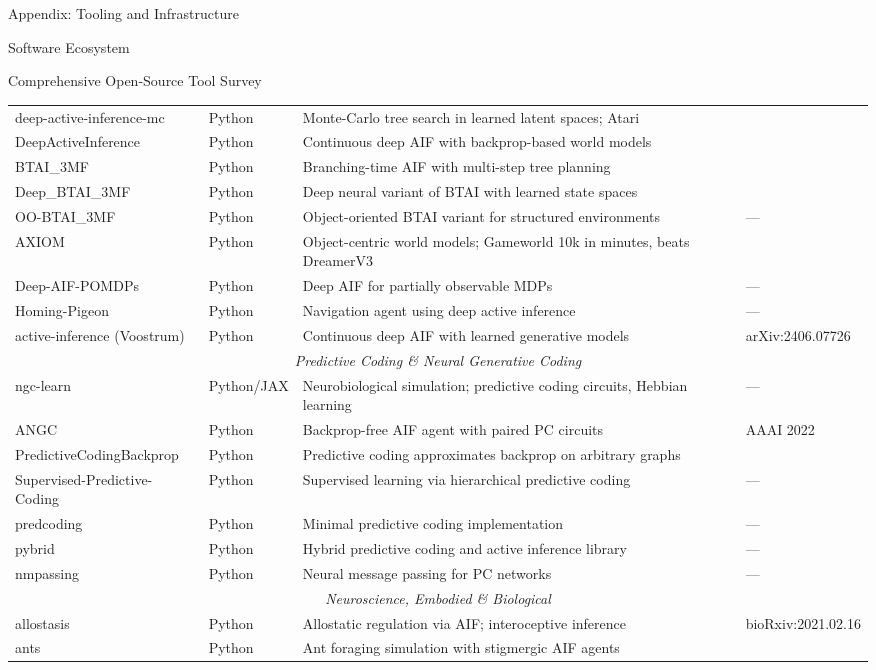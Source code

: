 \documentclass[
  ignorenonframetext,
]{beamer}
\begin{document}
\begin{frame}[fragile]{Appendix: Tooling and Infrastructure
\label{sec:tooling}}
\begin{block}{Software Ecosystem}
\begin{block}{Comprehensive Open-Source Tool Survey}
\begin{center}
\begin{longtable}{p{3.2cm} p{1.6cm} p{4.4cm} p{2.5cm}}
\hline
deep-active-inference-mc & Python & Monte-Carlo tree search in learned latent spaces; Atari & \cite{fountas2020deep} \\
DeepActiveInference & Python & Continuous deep AIF with backprop-based world models & \cite{millidge2020deep} \\
BTAI\_3MF & Python & Branching-time AIF with multi-step tree planning & \cite{champion2021realizing} \\
Deep\_BTAI\_3MF & Python & Deep neural variant of BTAI with learned state spaces & \cite{champion2021realizing} \\
OO-BTAI\_3MF & Python & Object-oriented BTAI variant for structured environments & — \\
AXIOM & Python & Object-centric world models; Gameworld 10k in minutes, beats DreamerV3 & \cite{heins2025axiom} \\
Deep-AIF-POMDPs & Python & Deep AIF for partially observable MDPs & — \\
Homing-Pigeon & Python & Navigation agent using deep active inference & — \\
active-inference (Voostrum) & Python & Continuous deep AIF with learned generative models & arXiv:2406.07726 \\
\hline
\multicolumn{4}{c}{\textit{Predictive Coding \& Neural Generative Coding}} \\
\hline
ngc-learn & Python/JAX & Neurobiological simulation; predictive coding circuits, Hebbian learning & — \\
ANGC & Python & Backprop-free AIF agent with paired PC circuits & AAAI 2022 \\
PredictiveCodingBackprop & Python & Predictive coding approximates backprop on arbitrary graphs & \cite{millidge2022predictive} \\
Supervised-Predictive-Coding & Python & Supervised learning via hierarchical predictive coding & — \\
predcoding & Python & Minimal predictive coding implementation & — \\
pybrid & Python & Hybrid predictive coding and active inference library & — \\
nmpassing & Python & Neural message passing for PC networks & — \\
\hline
\multicolumn{4}{c}{\textit{Neuroscience, Embodied \& Biological}} \\
\hline
allostasis & Python & Allostatic regulation via AIF; interoceptive inference & bioRxiv:2021.02.16 \\
ants & Python & Ant foraging simulation with stigmergic AIF agents & \cite{heins2024collective} \\

\end{longtable}
\end{center}
\end{block}
\end{block}
\end{frame}
\end{document}
